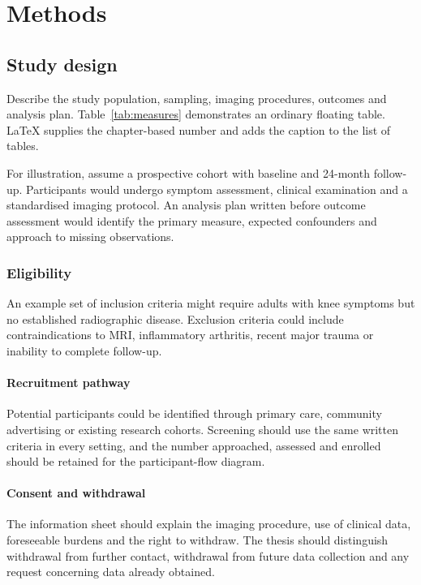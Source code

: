 \chapter{Methods}

\section{Study design}
Describe the study population, sampling, imaging procedures, outcomes and
analysis plan. Table~\ref{tab:measures} demonstrates an ordinary floating table.
LaTeX supplies the chapter-based number and adds the caption to the list of
tables.

For illustration, assume a prospective cohort with baseline and 24-month
follow-up. Participants would undergo symptom assessment, clinical examination
and a standardised imaging protocol. An analysis plan written before outcome
assessment would identify the primary measure, expected confounders and approach
to missing observations.

\subsection{Eligibility}
An example set of inclusion criteria might require adults with knee symptoms
but no established radiographic disease. Exclusion criteria could include
contraindications to MRI, inflammatory arthritis, recent major trauma or
inability to complete follow-up.

\subsubsection{Recruitment pathway}
Potential participants could be identified through primary care, community
advertising or existing research cohorts. Screening should use the same written
criteria in every setting, and the number approached, assessed and enrolled
should be retained for the participant-flow diagram.

\subsubsection{Consent and withdrawal}
The information sheet should explain the imaging procedure, use of clinical
data, foreseeable burdens and the right to withdraw. The thesis should
distinguish withdrawal from further contact, withdrawal from future data
collection and any request concerning data already obtained.

